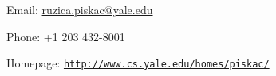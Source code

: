 \documentclass[11pt]{article}
\renewcommand{\section}[1]{\pagebreak[3]%
    \hyphenpenalty=10000%
    \vspace{1\baselineskip}%
    \phantomsection\addcontentsline{toc}{section}{#1}%
    \noindent\llap{\scshape\smash{\parbox[t]{\marginparwidth}{\raggedright #1}}}%
    \vspace{-\baselineskip}\par}
\newenvironment{innerlist}[1][\enskip\textbullet]%
        {\begin{itemize}[#1,leftmargin=*,parsep=0pt,itemsep=2pt,topsep=2pt,partopsep=0pt]}
        {\end{itemize}}
\newcommand{\halfblankline}{\quad\vspace{-0.5\baselineskip}\pagebreak[3]}
\providecommand*\url[1]{\href{#1}{#1}}
\renewcommand*\url[1]{\href{#1}{\texttt{#1}}}
\providecommand*\email[1]{\href{mailto:#1}{#1}}
\providecommand\Matlab{\textsc{Matlab}}
\begin{document}
Email: \email{ruzica.piskac@yale.edu}

Phone: +1 203 432-8001

Homepage: \url{http://www.cs.yale.edu/homes/piskac/}








\vspace{-2in}

\begin{comment}
Computer Programming:
%
\begin{innerlist}
    \item C, C$+$$+$, Java, JavaScript, NetLogo, Pascal, Perl, PHP,
        Lisp, UNIX shell scripting (including POSIX.2), GNU make,
        AppleScript, SQL, MySQL, \Matlab, Maple, Mathematica, and others
\end{innerlist}

\halfblankline
\end{comment}
\end{document}
